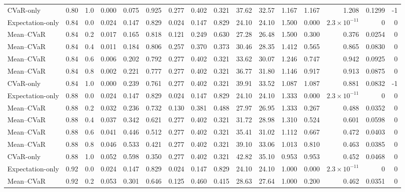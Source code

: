 \begin{table}[htbp]
{\begin{tabular}{lrrrrrrrrrrrrrrr}
CVaR-only & 0.80 & 1.0 & 0.000 & 0.075 & 0.925 & 0.277 & 0.402 & 0.321 & 37.62 & 32.57 & 1.167 & 1.167 & 1.208 & 0.1299 & -1\\
\addlinespace[0.25em]
Expectation-only & 0.84 & 0.0 & 0.024 & 0.147 & 0.829 & 0.024 & 0.147 & 0.829 & 24.10 & 24.10 & 1.500 & 0.000 & $2.3\times10^{-11}$ & 0 & 0\\
Mean--CVaR & 0.84 & 0.2 & 0.017 & 0.165 & 0.818 & 0.121 & 0.249 & 0.630 & 27.28 & 26.48 & 1.500 & 0.300 & 0.376 & 0.0254 & 0\\
Mean--CVaR & 0.84 & 0.4 & 0.011 & 0.184 & 0.806 & 0.257 & 0.370 & 0.373 & 30.46 & 28.35 & 1.412 & 0.565 & 0.865 & 0.0830 & 0\\
Mean--CVaR & 0.84 & 0.6 & 0.006 & 0.202 & 0.792 & 0.277 & 0.402 & 0.321 & 33.62 & 30.07 & 1.246 & 0.747 & 0.942 & 0.0925 & 0\\
Mean--CVaR & 0.84 & 0.8 & 0.002 & 0.221 & 0.777 & 0.277 & 0.402 & 0.321 & 36.77 & 31.80 & 1.146 & 0.917 & 0.913 & 0.0875 & 0\\
CVaR-only & 0.84 & 1.0 & 0.000 & 0.239 & 0.761 & 0.277 & 0.402 & 0.321 & 39.91 & 33.52 & 1.087 & 1.087 & 0.881 & 0.0832 & -1\\
\addlinespace[0.25em]
Expectation-only & 0.88 & 0.0 & 0.024 & 0.147 & 0.829 & 0.024 & 0.147 & 0.829 & 24.10 & 24.10 & 1.333 & 0.000 & $2.3\times10^{-11}$ & 0 & 0\\
Mean--CVaR & 0.88 & 0.2 & 0.032 & 0.236 & 0.732 & 0.130 & 0.381 & 0.488 & 27.97 & 26.95 & 1.333 & 0.267 & 0.488 & 0.0352 & 0\\
Mean--CVaR & 0.88 & 0.4 & 0.037 & 0.342 & 0.621 & 0.277 & 0.402 & 0.321 & 31.72 & 28.98 & 1.310 & 0.524 & 0.601 & 0.0598 & 0\\
Mean--CVaR & 0.88 & 0.6 & 0.041 & 0.446 & 0.512 & 0.277 & 0.402 & 0.321 & 35.41 & 31.02 & 1.112 & 0.667 & 0.472 & 0.0403 & 0\\
Mean--CVaR & 0.88 & 0.8 & 0.046 & 0.533 & 0.421 & 0.277 & 0.402 & 0.321 & 39.10 & 33.06 & 1.013 & 0.810 & 0.463 & 0.0385 & 0\\
CVaR-only & 0.88 & 1.0 & 0.052 & 0.598 & 0.350 & 0.277 & 0.402 & 0.321 & 42.82 & 35.10 & 0.953 & 0.953 & 0.452 & 0.0468 & 0\\
\addlinespace[0.25em]
Expectation-only & 0.92 & 0.0 & 0.024 & 0.147 & 0.829 & 0.024 & 0.147 & 0.829 & 24.10 & 24.10 & 1.000 & 0.000 & $2.3\times10^{-11}$ & 0 & 0\\
Mean--CVaR & 0.92 & 0.2 & 0.053 & 0.301 & 0.646 & 0.125 & 0.460 & 0.415 & 28.63 & 27.64 & 1.000 & 0.200 & 0.462 & 0.0351 & 0\\

\end{tabular}}
\end{table}

